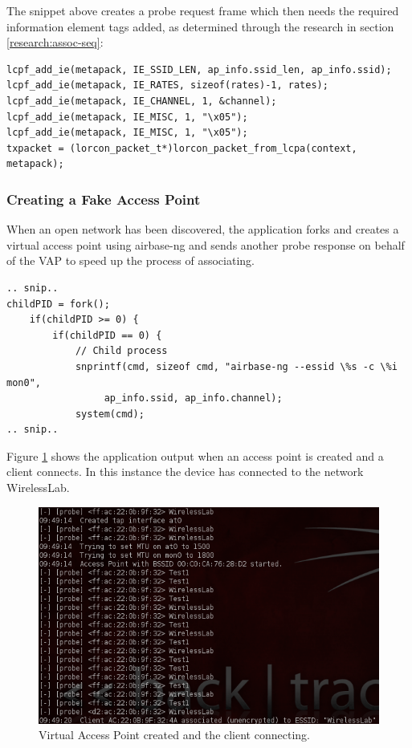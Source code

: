 The snippet above creates a probe request frame which then needs the required information element tags added, as determined through the research in section \ref{research:assoc-seq}:

\begin{verbatim}
lcpf_add_ie(metapack, IE_SSID_LEN, ap_info.ssid_len, ap_info.ssid);
lcpf_add_ie(metapack, IE_RATES, sizeof(rates)-1, rates);
lcpf_add_ie(metapack, IE_CHANNEL, 1, &channel);
lcpf_add_ie(metapack, IE_MISC, 1, "\x05");
lcpf_add_ie(metapack, IE_MISC, 1, "\x05");
txpacket = (lorcon_packet_t*)lorcon_packet_from_lcpa(context, metapack);
\end{verbatim}

\subsubsection{Creating a Fake Access Point}

When an open network has been discovered, the application forks and creates a virtual access point using airbase-ng and sends another probe response on behalf of the VAP to speed up the process of associating. 

\begin{verbatim}
.. snip..
childPID = fork();
	if(childPID >= 0) {
		if(childPID == 0) {
			// Child process
			snprintf(cmd, sizeof cmd, "airbase-ng --essid \%s -c \%i mon0",
				 ap_info.ssid, ap_info.channel);
			system(cmd);
.. snip..
\end{verbatim}

Figure \ref{client-connected} shows the application output when an access point is created and a client connects. In this instance the device has connected to the network WirelessLab.

\begin{figure}[h!]
\centering\includegraphics[width=\linewidth]{implementation/figures/client-assoc-1.png}
\caption{Virtual Access Point created and the client connecting.}
\label{client-connected}
\end{figure}

